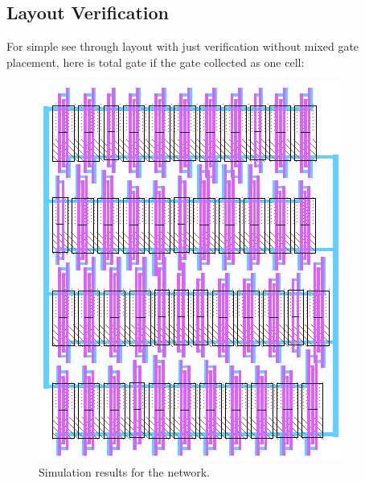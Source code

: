 \documentclass[10pt,journal,compsoc]{IEEEtran}
\begin{document}
\subsection{Layout Verification}
For simple see through layout with just verification without mixed gate placement, here is total gate if the gate collected as one cell:
\begin{figure}[h]
	\centering
	\includegraphics[scale=0.8]{images/gate1}
	\caption{Simulation results for the network.}
	\label{fig_sim}
\end{figure}
\end{document}
